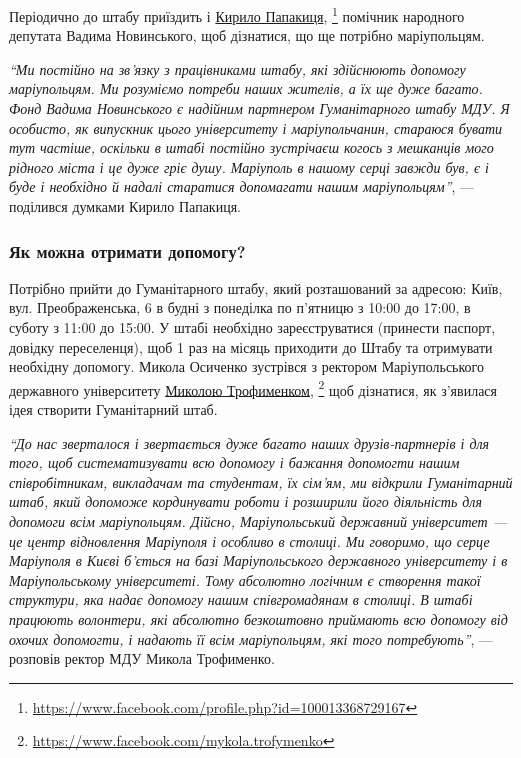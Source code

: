 Періодично до штабу приїздить і \href{https://www.facebook.com/profile.php?id=100013368729167}{Кирило Папакиця},%
\footnote{\url{https://www.facebook.com/profile.php?id=100013368729167}}
помічник народного депутата Вадима Новинського, щоб дізнатися, що ще потрібно
маріупольцям.

\begin{leftbar}
\emph{\enquote{Ми постійно на зв'язку з працівниками штабу, які здійснюють допомогу
маріупольцям. Ми розуміємо потреби наших жителів, а їх ще дуже багато. Фонд
Вадима Новинського є надійним партнером Гуманітарного штабу МДУ. Я особисто, як
випускник цього університету і маріупольчанин, стараюся бувати тут частіше,
оскільки в штабі постійно зустрічаєш когось з мешканців мого рідного міста і це
дуже гріє душу. Маріуполь в нашому серці завжди був, є і буде і необхідно й
надалі старатися допомагати нашим маріупольцям}}, — поділився думками Кирило
Папакиця.
\end{leftbar}


\subsubsection{Як можна отримати допомогу?}

Потрібно прийти до Гуманітарного штабу, який розташований за адресою: Київ,
вул. Преображенська, 6 в будні з понеділка по п'ятницю з 10:00 до 17:00, в
суботу з 11:00 до 15:00. У штабі необхідно зареєструватися (принести паспорт,
довідку переселенця), щоб 1 раз на місяць приходити до Штабу та отримувати
необхідну допомогу. Микола Осиченко зустрівся з ректором Маріупольського
державного університету \href{https://www.facebook.com/mykola.trofymenko}{Миколою Трофименком},%
\footnote{\url{https://www.facebook.com/mykola.trofymenko}} щоб дізнатися, як з'явилася ідея створити Гуманітарний штаб.

\begin{leftbar}
\emph{\enquote{До нас зверталося і звертається дуже багато наших друзів-партнерів і для
того, щоб систематизувати всю допомогу і бажання допомогти нашим
співробітникам, викладачам та студентам, їх сім'ям, ми відкрили Гуманітарний
штаб, який допоможе кординувати роботи і розширили його діяльність для допомоги
всім маріупольцям. Дійсно, Маріупольський державний університет — це центр
відновлення Маріуполя і особливо в столиці. Ми говоримо, що серце Маріуполя в
Києві б'ється на базі Маріупольського державного університету і в
Маріупольському університеті. Тому абсолютно логічним є створення такої
структури, яка надає допомогу нашим співгромадянам в столиці. В штабі працюють
волонтери, які абсолютно безкоштовно приймають всю допомогу від охочих
допомогти, і надають її всім маріупольцям, які того потребують}}, — розповів
ректор МДУ Микола Трофименко.
\end{leftbar}

